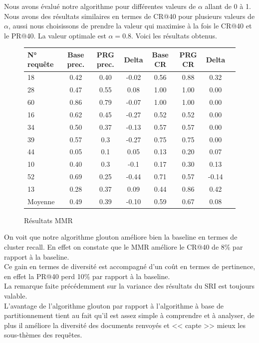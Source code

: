 \documentclass{article}
\begin{document}
Nous avons évalué notre algorithme pour différentes valeurs de $\alpha$ allant de 0 à 1. Nous avons des résultats similaires en termes de CR@40 pour plusieurs valeurs de $\alpha$, aussi nous choisissons de prendre la valeur qui maximise à la fois le CR@40 et le PR@40. La valeur optimale est $\alpha = 0.8$. Voici les résultats obtenus.

\begin{figure}[H]
\begin{tabular}{l*{6}{c}r}
N° requête & Base prec. & PRG prec. & Delta  & Base CR & PRG CR & Delta\\ 
\hline
   18 &    0.42   &   0.40   &   -0.02 &  0.56  & 0.88  &    0.32 \\
   28 &    0.47   &   0.55   &    0.08 &  1.00  & 1.00  &    0.00 \\
   60 &    0.86   &   0.79   &   -0.07 &  1.00  & 1.00  &    0.00 \\
   16 &    0.62   &   0.45   &   -0.27 &  0.52  & 0.52  &    0.00 \\
   34 &    0.50   &   0.37   &   -0.13 &  0.57  & 0.57  &    0.00 \\
   39 &    0.57   &   0.3   &    -0.27 &  0.75  & 0.75  &    0.00 \\
   44 &    0.05   &   0.1   &     0.05 &  0.13  & 0.20  &    0.07 \\
   10 &    0.40   &   0.3   &    -0.1 &  0.17  & 0.30  &     0.13 \\
   52 &    0.69   &   0.25   &   -0.44 &  0.71  & 0.57  &   -0.14 \\
   13 &    0.28   &   0.37   &    0.09 &  0.44  & 0.86  &    0.42 \\
\hline
Moyenne  &    0.49   &   0.39   &   -0.10 &  0.59  & 0.67  &   0.08 \\
\end{tabular}
\caption{Résultats MMR}
\end{figure}

On voit que notre algorithme glouton améliore bien la baseline en termes de cluster recall. En effet on constate que le MMR améliore le CR@40 de 8\% par rapport à la baseline.\\
Ce gain en termes de diversité est accompagné d'un coût en termes de pertinence, en effet la PR@40 perd 10\% par rapport à la baseline. \\
La remarque faite précédemment sur la variance des résultats du SRI est toujours valable.\\

L'avantage de l'algorithme glouton par rapport à l'algorithme à base de partitionnement tient au fait qu'il est assez simple à comprendre et à analyser, de plus il améliore la diversité des documents renvoyés et << capte >> mieux les sous-thèmes des requêtes. 
\end{document}
